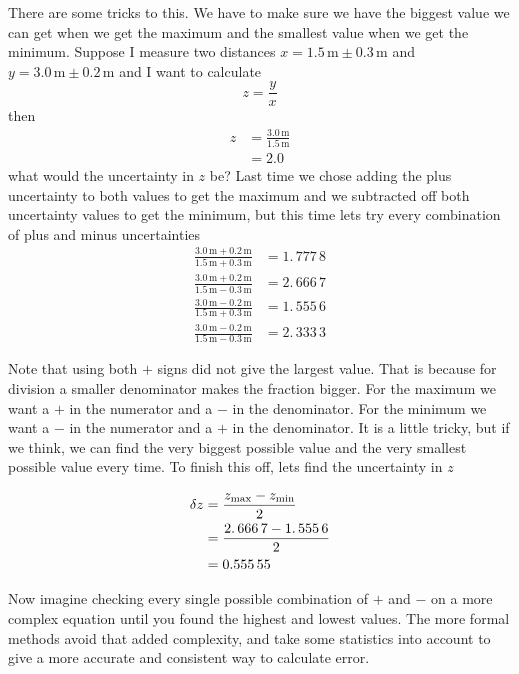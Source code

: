 \documentclass[twoside,11pt,ShortChapTitles]{BYUTextbook}
\begin{document}
There are some tricks to this. We have to make sure we have the biggest value
we can get when we get the maximum and the smallest value when we get the
minimum. Suppose I measure two distances $x=1.5\,\text{m} \pm0.3\,\text{m} $ and $y=3.0\,\text{m} \pm0.2\,\text{m} $ and I want to calculate\[
z=\frac{y}{x}
\]
then\begin{align*}
z  & =\frac{3.0\,\text{m} }{1.5\,\text{m} }\\
& =2.0
\end{align*}
what would the uncertainty in $z$ be? Last time we chose adding the plus
uncertainty to both values to get the maximum and we subtracted off both
uncertainty values to get the minimum, but this time lets try every
combination of plus and minus uncertainties
\begin{align*}
\frac{3.0\,\text{m} +0.2\,\text{m} }{1.5\,\text{m} +0.3\,\text{m} }  & =\allowbreak1.\,\allowbreak777\,8\\
\frac{3.0\,\text{m} +0.2\,\text{m} }{1.5\,\text{m} -0.3\,\text{m} }  & =\allowbreak2.\,\allowbreak666\,7\\
\frac{3.0\,\text{m} -0.2\,\text{m} }{1.5\,\text{m} +0.3\,\text{m} }  & =1.\,\allowbreak555\,6\\
\frac{3.0\,\text{m} -0.2\,\text{m} }{1.5\,\text{m} -0.3\,\text{m} }  & =\allowbreak2.\,\allowbreak333\,3
\end{align*}


Note that using both $+$ signs did not give the largest value. That is because
for division a smaller denominator makes the fraction bigger. For the maximum
we want a $+$ in the numerator and a $-$ in the denominator. For the minimum
we want a $-$ in the numerator and a $+$ in the denominator. It is a little
tricky, but if we think, we can find the very biggest possible value and the
very smallest possible value every time. To finish this off, lets find the
uncertainty in $z$

\begin{align*}
\delta z  & =\frac{z_{\max}-z_{\min}}{2}\\
& =\frac{\allowbreak2.\,\allowbreak666\,7-1.\,\allowbreak555\,6}{2}\\
& =\allowbreak0.555\,55
\end{align*}

Now imagine checking every single possible combination of $+$ and $-$ on a more complex equation until you found the highest and lowest values.  The more formal methods avoid that added complexity, and take some statistics into account to give a more accurate and consistent way to calculate error.
\end{document}
